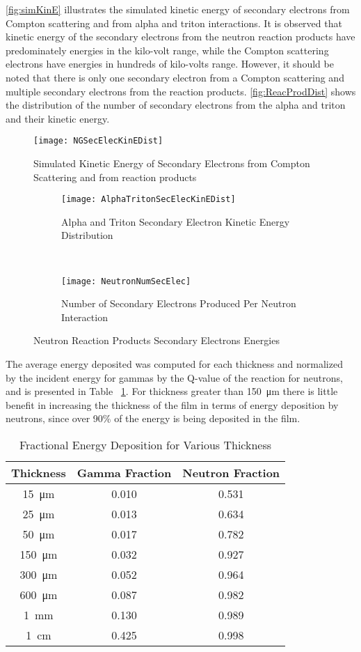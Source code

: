 \autoref{fig:simKinE} illustrates the simulated kinetic energy of secondary electrons from Compton scattering and from alpha and triton interactions.
It is observed that kinetic energy of the secondary electrons from the neutron reaction products have predominately energies in the kilo-volt range, while the Compton scattering electrons have energies in hundreds of kilo-volts range. 
However, it should be noted that there is only one secondary electron from a Compton scattering and multiple secondary electrons from the reaction products.
\autoref{fig:ReacProdDist} shows the distribution of the number of secondary electrons from the alpha and triton and their kinetic energy.
\begin{figure}[ht]
    \centering
    \texttt{[image: NGSecElecKinEDist]}
    \caption{Simulated Kinetic Energy of Secondary Electrons from Compton Scattering and from  reaction products}
    \label{fig:simKinE}
\end{figure}
\begin{figure*}[ht]
	\centering
	\begin{subfigure}[b]{0.45\textwidth}
    		\texttt{[image: AlphaTritonSecElecKinEDist]}
		\caption{Alpha and Triton Secondary Electron Kinetic Energy Distribution}
	\end{subfigure}%
	~
	\begin{subfigure}[b]{0.45\textwidth}
    		\texttt{[image: NeutronNumSecElec]}
		\caption{Number of Secondary Electrons Produced Per Neutron Interaction}
	\end{subfigure}%
	\caption{Neutron Reaction Products Secondary Electrons Energies}
	\label{fig:ReacProdDist}
\end{figure*}

The average energy deposited was computed for each thickness and normalized by the incident energy for gammas by the Q-value of the reaction for neutrons, and is presented in Table ~\ref{tab:FractionEDep}.
For thickness greater than \SI{150}{\um} there is little benefit in increasing the thickness of the film in terms of energy deposition by neutrons, since over 90\% of the energy is being deposited in the film.
\begin{table}[ht]
    \caption{Fractional Energy Deposition for Various Thickness}
	\centering
	\begin{tabular}{c | c c}
	Thickness & Gamma Fraction & Neutron Fraction \\
	\hline
	\hline
	\SI{15}{\um} & 0.010 & 0.531 \\
	\SI{25}{\um} & 0.013 & 0.634 \\
	\SI{50}{\um} & 0.017 & 0.782 \\
	\SI{150}{\um} & 0.032 & 0.927 \\
	\SI{300}{\um} & 0.052 & 0.964 \\
	\SI{600}{\um} & 0.087 & 0.982 \\
	\SI{1}{\mm} & 0.130 & 0.989 \\
	\SI{1}{\cm} & 0.425 & 0.998 \\
	\end{tabular}
  \label{tab:FractionEDep}
\end{table}


